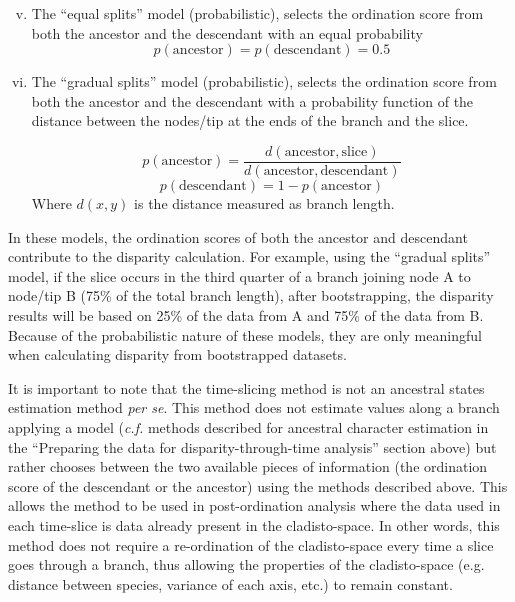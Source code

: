 \documentclass[12pt,a4paper]{article}
\begin{document}
\begin{enumerate}
    \begin{enumerate}[(i)]
    \setcounter{enumii}{4}
      \item The ``equal splits'' model (probabilistic), selects the ordination score from both the ancestor and the descendant with an equal probability
          \begin{equation}
          p(\text{ancestor}) = p(\text{descendant}) = 0.5
          \end{equation}

    \item The ``gradual splits'' model (probabilistic), selects the ordination score from both the ancestor and the descendant with a probability function of the distance between the nodes/tip at the ends of the branch and the slice.

          \begin{equation}
              p(\text{ancestor}) = \frac{d(\text{ancestor},\text{slice})}{d(\text{ancestor},\text{descendant})}
          \end{equation}
          \begin{equation}
              p(\text{descendant}) = 1 - p(\text{ancestor})
          \end{equation}
    \noindent Where $d(x,y)$ is the distance measured as branch length.
    \end{enumerate}

    In these models, the ordination scores of both the ancestor and descendant contribute to the disparity calculation.
    For example, using the ``gradual splits'' model, if the slice occurs in the third quarter of a branch joining node A to node/tip B (75\% of the total branch length), after bootstrapping, the disparity results will be based on 25\% of the data from A and 75\% of the data from B.
    Because of the probabilistic nature of these models, they are only meaningful when calculating disparity from bootstrapped datasets.
\end{enumerate}

It is important to note that the time-slicing method is not an ancestral states estimation method \textit{per se}.
This method does not estimate values along a branch applying a model (\textit{c.f.} methods described for ancestral character estimation in the ``Preparing the data for disparity-through-time analysis'' section above) but rather chooses between the two available pieces of information (the ordination score of the descendant or the ancestor) using the methods described above.
This allows the method to be used in post-ordination analysis where the data used in each time-slice is data already present in the cladisto-space.
In other words, this method does not require a re-ordination of the cladisto-space every time a slice goes through a branch, thus allowing the properties of the cladisto-space (e.g. distance between species, variance of each axis, etc.) to remain constant.
 
\end{document}
